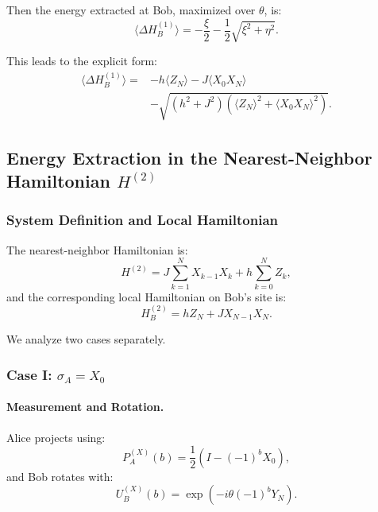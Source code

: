 Then the energy extracted at Bob, maximized over \( \theta \), is:
\begin{equation}
\langle \Delta H_B^{(1)} \rangle = -\frac{\xi}{2} - \frac{1}{2} \sqrt{\xi^2 + \eta^2}.
\end{equation}

This leads to the explicit form:
\begin{align}
\langle \Delta H_B^{(1)} \rangle ={}& -h \langle Z_N \rangle - J \langle X_0 X_N \rangle \nonumber \\
& - \sqrt{(h^2 + J^2)(\langle Z_N \rangle^2 + \langle X_0 X_N \rangle^2)}.
\end{align}

\subsection{Energy Extraction in the Nearest-Neighbor Hamiltonian \texorpdfstring{$H^{(2)}$}{H2}}

\subsubsection{System Definition and Local Hamiltonian}

The nearest-neighbor Hamiltonian is:
\begin{equation}
H^{(2)} = J \sum_{k=1}^{N} X_{k-1} X_k + h \sum_{k=0}^{N} Z_k,
\end{equation}
and the corresponding local Hamiltonian on Bob's site is:
\begin{equation}
H_B^{(2)} = h Z_N + J X_{N-1} X_N.
\end{equation}

We analyze two cases separately.

\subsubsection{Case I: \texorpdfstring{$\sigma_A = X_0$}{sigmaAX0}}

\paragraph{Measurement and Rotation.}
Alice projects using:
\begin{equation}
P_A^{(X)}(b) = \frac{1}{2} \left( I - (-1)^b X_0 \right),
\end{equation}
and Bob rotates with:
\begin{equation}
U_B^{(X)}(b) = \exp(-i \theta (-1)^b Y_N).
\end{equation}

